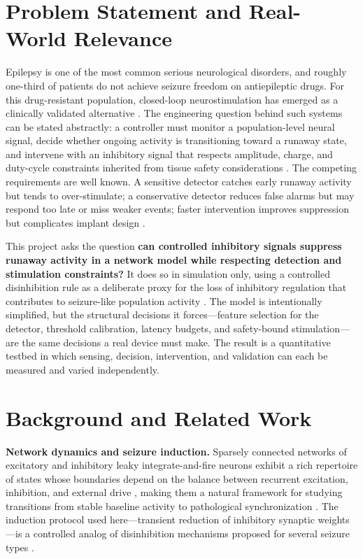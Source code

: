 \documentclass[12pt]{article}
\begin{document}
\section{Problem Statement and Real-World Relevance}
Epilepsy is one of the most common serious neurological disorders, and roughly one-third of patients do not achieve seizure freedom on antiepileptic drugs. For this drug-resistant population, closed-loop neurostimulation has emerged as a clinically validated alternative \cite{morrell2011,nair2020}. The engineering question behind such systems can be stated abstractly: a controller must monitor a population-level neural signal, decide whether ongoing activity is transitioning toward a runaway state, and intervene with an inhibitory signal that respects amplitude, charge, and duty-cycle constraints inherited from tissue safety considerations \cite{shannon1992,mccreery1990}. The competing requirements are well known. A sensitive detector catches early runaway activity but tends to over-stimulate; a conservative detector reduces false alarms but may respond too late or miss weaker events; faster intervention improves suppression but complicates implant design \cite{kassiri2024,dumpelmann2019}.

This project asks the question \textbf{can controlled inhibitory signals suppress runaway activity in a network model while respecting detection and stimulation constraints?} It does so in simulation only, using a controlled disinhibition rule as a deliberate proxy for the loss of inhibitory regulation that contributes to seizure-like population activity \cite{maheshwari2014}. The model is intentionally simplified, but the structural decisions it forces---feature selection for the detector, threshold calibration, latency budgets, and safety-bound stimulation---are the same decisions a real device must make. The result is a quantitative testbed in which sensing, decision, intervention, and validation can each be measured and varied independently.

\section{Background and Related Work}
\textbf{Network dynamics and seizure induction.} Sparsely connected networks of excitatory and inhibitory leaky integrate-and-fire neurons exhibit a rich repertoire of states whose boundaries depend on the balance between recurrent excitation, inhibition, and external drive \cite{brunel2000}, making them a natural framework for studying transitions from stable baseline activity to pathological synchronization \cite{maheshwari2014}. The induction protocol used here---transient reduction of inhibitory synaptic weights---is a controlled analog of disinhibition mechanisms proposed for several seizure types \cite{maheshwari2014}.
\end{document}
